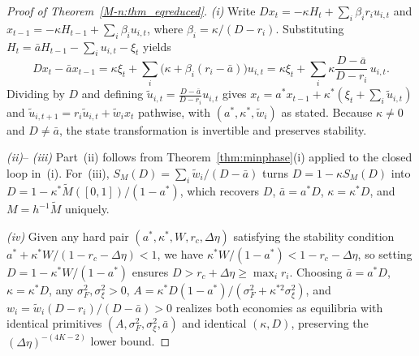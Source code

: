 \documentclass[12pt]{article}
\theoremstyle{definition}
\theoremstyle{remark}
\begin{document}
\begin{proof}[Proof of Theorem~\ref{M-n:thm_eqreduced}]
\emph{(i)} Write $D x_t = -\kappa H_t + \sum_i \beta_i r_i u_{i,t}$ and $x_{t-1} = -\kappa H_{t-1} + \sum_i \beta_i u_{i,t}$, where $\beta_i = \kappa/(D - r_i)$. Substituting $H_t = \bar{a} H_{t-1} - \sum_i u_{i,t} - \xi_t$ yields
\[
  D x_t - \bar{a} x_{t-1} = \kappa \xi_t + \sum_i \bigl(\kappa + \beta_i(r_i - \bar{a})\bigr) u_{i,t} = \kappa \xi_t + \sum_i \kappa \frac{D - \bar{a}}{D - r_i}\, u_{i,t}.
\]
Dividing by $D$ and defining $\tilde{u}_{i,t} = \frac{D - \bar{a}}{D - r_i} u_{i,t}$ gives $x_t = a^* x_{t-1} + \kappa^*(\xi_t + \sum_i \tilde{u}_{i,t})$ and $\tilde{u}_{i,t+1} = r_i \tilde{u}_{i,t} + \tilde{w}_i x_t$ pathwise, with $(a^*, \kappa^*, \tilde{w}_i)$ as stated. Because $\kappa \neq 0$ and $D \neq \bar{a}$, the state transformation is invertible and preserves stability.

\emph{(ii)}-- \emph{(iii)} Part~(ii) follows from Theorem~\ref{thm:minphase}(i) applied to the closed loop in~(i). For~(iii), $S_M(D) = \sum_i \tilde{w}_i/(D - \bar{a})$ turns $D = 1 - \kappa S_M(D)$ into $D = 1 - \kappa^* \tilde{M}([0,1])/(1 - a^*)$, which recovers $D$, $\bar{a} = a^* D$, $\kappa = \kappa^* D$, and $M = h^{-1} \tilde{M}$ uniquely.

\emph{(iv)} Given any hard pair $(a^*, \kappa^*, W, r_c, \Delta\eta)$ satisfying the stability condition $a^* + \kappa^* W / (1 - r_c - \Delta\eta) < 1$, we have $\kappa^* W / (1 - a^*) < 1 - r_c - \Delta\eta$, so setting $D = 1 - \kappa^* W/(1 - a^*)$ ensures $D > r_c + \Delta\eta \ge \max_i r_i$. Choosing $\bar{a} = a^* D$, $\kappa = \kappa^* D$, any $\sigma_F^2, \sigma_\xi^2 > 0$, $A = \kappa^* D(1 - a^*)/(\sigma_F^2 + \kappa^{*2} \sigma_\xi^2)$, and $w_i = \tilde{w}_i(D - r_i)/(D - \bar{a}) > 0$ realizes both economies as equilibria with identical primitives $(A, \sigma_F^2, \sigma_\xi^2, \bar{a})$ and identical $(\kappa, D)$, preserving the $(\Delta\eta)^{-(4K-2)}$ lower bound.
\end{proof}
\end{document}
